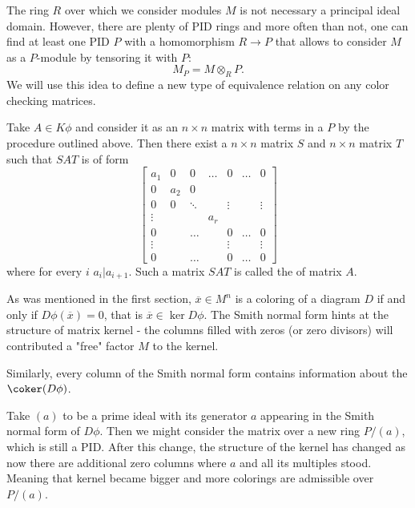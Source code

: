 The ring $R$ over which we consider modules $M$ is not necessary a principal ideal domain. However, there are plenty of PID rings and more often than not, one can find at least one PID $P$ with a homomorphism $R\to P$ that allows to consider $M$ as a $P$-module by tensoring it with $P$:
$$M_P=M\otimes_R P.$$
We will use this idea to define a new type of equivalence relation on any color checking matrices.

\begin{definition}
Take $A\in K\phi$ and consider it as an $n\times n$ matrix with terms in a $P$ by the procedure outlined above. Then there exist a $n\times n$ matrix $S$ and $n\times n$ matrix $T$ such that $SAT$ is of form
$$
\begin{bmatrix}
  a_1 & 0 & 0 & \hdots & 0 & \hdots & 0 \\ 
  0 & a_2 & 0\\ 
  0 & 0 & \ddots & & \vdots & & \vdots\\ 
  \vdots & & & a_r\\ 
  0 & & \hdots & & 0 & \hdots & 0 \\ 
  \vdots & & & & \vdots & & \vdots\\ 
  0 & & \hdots & & 0 & \hdots & 0
\end{bmatrix}
$$
where for every $i$ $a_i|a_{i+1}$. Such a matrix $SAT$ is called the  of matrix $A$.
\end{definition}

As was mentioned in the first section, $\overline{x}\in M^n$ is a coloring of a diagram $D$ if and only if $D\phi(\overline{x})=0$, that is $\overline{x}\in\ker D\phi$. The Smith normal form hints at the structure of matrix kernel - the columns filled with zeros (or zero divisors) will contributed a "free" factor $M$ to the kernel. 

Similarly, every column of the Smith normal form contains information about the $\coker(D\phi)$.



Take $(a)$ to be a prime ideal with its generator $a$ appearing in the Smith normal form of $D\phi$. Then we might consider the matrix over a new ring $P/(a)$, which is still a PID. After this change, the structure of the kernel has changed as now there are additional zero columns where $a$ and all its multiples stood. Meaning that kernel became bigger and more colorings are admissible over $P/(a)$.

